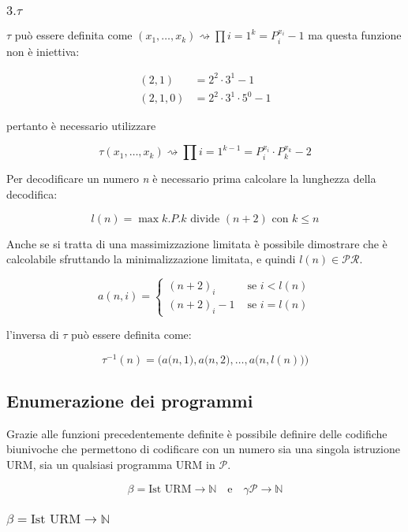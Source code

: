 \subsubsection{$3. \tau $}

$ \tau $ può essere definita come $ (x_1, \ldots, x_k) \rightsquigarrow \prod\limits{i=1}^{k} = P_{i}^{x_i} -1$ ma questa funzione non è iniettiva:

\begin{align*}
(2,1) &= 2^2 \cdot 3^1 -1 \\
(2,1,0) &= 2^2 \cdot 3^1  \cdot 5^0 -1
\end{align*}

pertanto è necessario utilizzare

$$
\tau(x_1, \ldots, x_k) \rightsquigarrow \prod\limits{i=1}^{k-1} = P_{i}^{x_i} \cdot P_{k}^{x_k} - 2
$$

Per decodificare un numero \textit{n} è necessario prima calcolare la lunghezza della decodifica:

$$
l(n) = \max k.P.k \text{ divide } (n+2) \text{ con } k \leq n
$$

Anche se si tratta di una massimizzazione limitata è possibile dimostrare che è calcolabile sfruttando la minimalizzazione limitata, e quindi $ l(n) \in \mathcal{PR} $.

$$
a(n,i) = \begin{cases}
(n+2)_i &\text{ se } i < l(n)\\
(n+2)_i -1 &\text{ se } i = l(n)
\end{cases}
$$

l'inversa di $ \tau $ può essere definita come:

$$
\tau^{-1}(n) = \Big(a\big(n,1\big), a\big(n,2\big), \ldots, a\big(n,l(n)\big)\Big)
$$

\subsection{Enumerazione dei programmi}

Grazie alle funzioni precedentemente definite è possibile definire delle codifiche biunivoche che permettono di codificare con un numero sia una singola istruzione URM, sia un qualsiasi programma URM in $ \mathcal{P} $.

$$
\beta = \text{Ist URM} \rightarrow \mathbb{N} \quad \text{e} \quad \gamma \mathcal{P} \rightarrow \mathbb{N}
$$

\subsubsection{$ \beta = \text{Ist URM} \rightarrow \mathbb{N} $}

